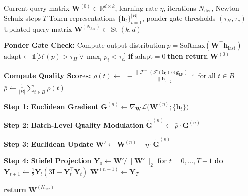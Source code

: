 \documentclass[twocolumn]{article}
\DeclareMathOperator{\St}{St}
\begin{document}
\begin{algorithm}[H]
\caption{QASP Update Procedure}
\label{alg:qasp}
\begin{algorithmic}[1]
\REQUIRE Current query matrix $\mathbf{W}^{(0)} \in \mathbb{R}^{d \times k}$, learning rate $\eta$, iterations $N_{\mathrm{iter}}$, Newton-Schulz steps $T$
\REQUIRE Token representations $\{\mathbf{h}_t\}_{t=1}^{|B|}$, ponder gate thresholds $(\tau_H, \tau_c)$
\ENSURE Updated query matrix $\mathbf{W}^{(N_{\mathrm{iter}})} \in \St(k, d)$

\STATE \textbf{Ponder Gate Check:}
\STATE \quad Compute output distribution $p = \mathrm{Softmax}(\mathbf{W}^\top \mathbf{h}_{\mathrm{last}})$
\STATE \quad $\mathrm{adapt} \leftarrow \mathbb{1}\bigl[\mathcal{H}(p) > \tau_H \lor \max_i p_i < \tau_c\bigr]$
\STATE \quad \textbf{if} $\mathrm{adapt} = 0$ \textbf{then return} $\mathbf{W}^{(0)}$

\STATE \textbf{Compute Quality Scores:}
\STATE \quad $\rho(t) \leftarrow 1 - \frac{\|\mathcal{F}^{-1}(\mathcal{F}(\mathbf{h}_t) \odot \mathbf{g}_{\mathrm{LP}})\|_2}{\|\mathbf{h}_t\|_2}$ for all $t \in B$ 
\STATE \quad $\bar{\rho} \leftarrow \frac{1}{|B|} \sum_{t \in B} \rho(t)$

    \STATE \textbf{Step 1: Euclidean Gradient}
    \STATE \quad $\mathbf{G}^{(n)} \leftarrow \nabla_{\mathbf{W}} \mathcal{L}\bigl(\mathbf{W}^{(n)}; \{\mathbf{h}_t\}\bigr)$
    
    \STATE \textbf{Step 2: Batch-Level Quality Modulation}
    \STATE \quad $\widetilde{\mathbf{G}}^{(n)} \leftarrow \bar{\rho} \cdot \mathbf{G}^{(n)}$ 
    
    \STATE \textbf{Step 3: Euclidean Update}
    \STATE \quad $\mathbf{W}' \leftarrow \mathbf{W}^{(n)} - \eta \cdot \widetilde{\mathbf{G}}^{(n)}$ 
    
    \STATE \textbf{Step 4: Stiefel Projection}
    \STATE \quad $\mathbf{Y}_0 \leftarrow \mathbf{W}' / \|\mathbf{W}'\|_2$
    \STATE \quad \textbf{for} $t = 0, \dots, T-1$ \textbf{do}
    \STATE \quad \quad $\mathbf{Y}_{t+1} \leftarrow \frac{1}{2} \mathbf{Y}_t (3\mathbf{I} - \mathbf{Y}_t^\top \mathbf{Y}_t)$
    \STATE \quad $\mathbf{W}^{(n+1)} \leftarrow \mathbf{Y}_T$ 
\ENDFOR

\STATE \textbf{return} $\mathbf{W}^{(N_{\mathrm{iter}})}$
\end{algorithmic}
\end{algorithm}
\end{document}
